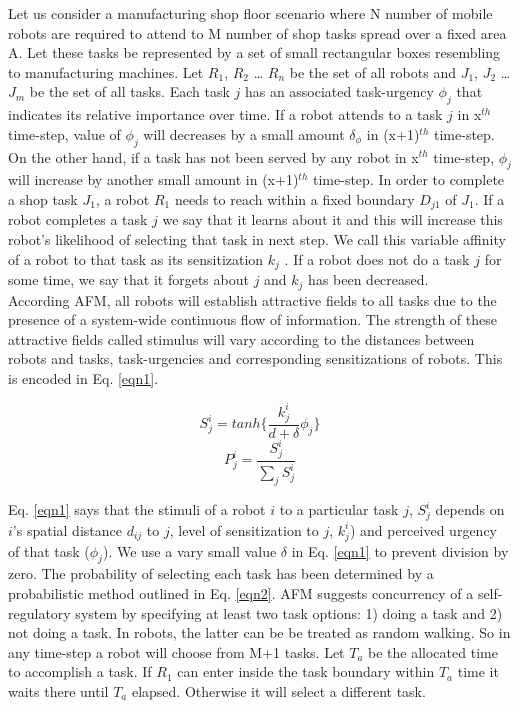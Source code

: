 \documentclass{llncs}
\begin{document}
Let us consider a manufacturing shop floor scenario where N number of mobile robots are required to attend to M number of shop tasks spread over a fixed area A. Let these tasks be represented by a set of small rectangular boxes resembling to manufacturing machines. Let $R_1$, $R_2$ … $R_n$ be the set of all robots and $J_1$, $J_2$ … $J_m$ be the set of all tasks. Each task $j$ has an associated task-urgency $\phi_j$ that indicates its relative importance over time. If a robot attends to a task $j$ in x$^{th}$ time-step, value of $\phi_j$ will decreases by a small amount $\delta_\phi$ in (x+1)$^{th}$ time-step. On the other hand, if a task has not been served by any robot in x$^{th}$ time-step, $\phi_j$ will increase by another small amount in (x+1)$^{th}$ time-step. In order to complete a shop task $J_1$, a robot $R_1$ needs to reach within a fixed boundary $D_{j1}$ of $J_1$. If a robot completes a task $j$ we say that it learns about it and this will increase this robot's likelihood of selecting that task in next step. We call this variable affinity of a robot to that task as its sensitization $k_j$ . If a robot does not do a task $j$ for some time, we say that it forgets about $j$ and $k_j$ has been decreased.\\
According AFM, all robots will establish attractive fields to all tasks due to the presence of a system-wide continuous flow of information. The strength of these attractive fields called stimulus will vary according to the distances between robots and tasks, task-urgencies and corresponding sensitizations of robots. This is encoded in Eq. \ref{eqn1}.
\begin{small}
\begin{multicols}{2}
\begin{equation}
S_{j}^{i} = tanh\{\frac{k_{j}^{i}}{d+\delta } \phi _{j}\}
\label{eqn1}
\end{equation}
\vspace*{0.25cm}
\begin{equation}
P_{j}^{i} = \frac{S_{j}^{i}}{\sum_{j}^{}S_{j}^{i}}
\label{eqn2}
\end{equation}
\end{multicols}
\end{small}
Eq. \ref{eqn1} says that the stimuli of a robot $i$ to a particular task $j$, $S_{j}^{i}$ depends on $i$'s spatial distance $d_{ij}$ to $j$, level of sensitization to $j$, $k_{j}^{i}$) and perceived urgency of that task ($\phi _{j}$). We use a vary small value $\delta$ in Eq. \ref{eqn1} to prevent division by zero. The probability of selecting each task has been determined by a probabilistic method outlined in Eq. \ref{eqn2}.
AFM suggests concurrency of a self-regulatory system by specifying at least two task options: 1) doing a task and 2) not doing a task. In robots, the latter can be be treated as random walking. So in any time-step a robot will choose from M+1 tasks. Let $T_a$ be the allocated time to accomplish a task. If $R_1$ can enter inside the task boundary within $T_a$ time it waits there until $T_a$ elapsed. Otherwise it will select a different task.
\end{document}
